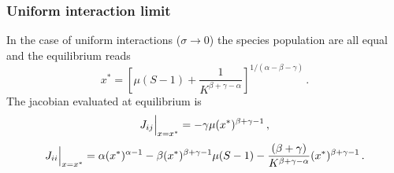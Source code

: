 \documentclass[10pt]{article}
\begin{document}
\subsubsection{Uniform interaction limit}
In the case of uniform interactions ($\sigma\to0$)
the species population are all equal and the equilibrium reads
\begin{equation}
    x^*=\left[\mu(S-1)+\frac{1}{K^{\beta+\gamma-\alpha}}\right]^{1/(\alpha-\beta-\gamma)} \, .
\end{equation}
The jacobian evaluated at equilibrium is
\begin{equation}
    J_{ij}\Big{|}_{x=x^*} = -\gamma \mu (x^*)^{\beta+\gamma-1} \, ,
\end{equation}
\begin{equation}
    J_{ii}\Big{|}_{x=x^*} = \alpha (x^*)^{\alpha-1}-\beta (x^*)^{\beta+\gamma-1}\mu(S-1)
                            -\frac{(\beta+\gamma)}{K^{\beta+\gamma-\alpha}}(x^*)^{\beta+\gamma-1}\, .
\end{equation}
\end{document}
